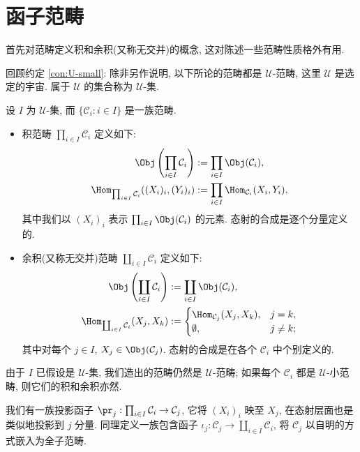 \section{函子范畴}\label{sec:functor-category}
首先对范畴定义积和余积(又称无交并)的概念, 这对陈述一些范畴性质格外有用.

回顾约定 \ref{con:U-small}: 除非另作说明, 以下所论的范畴都是 $\mathcal{U}$-范畴, 这里 $\mathcal{U}$ 是选定的宇宙. 属于 $\mathcal{U}$ 的集合称为 $\mathcal{U}$-集.

\begin{definition}
	设 $I$ 为 $\mathcal{U}$-集, 而 $\{\mathcal{C}_i : i \in I \}$ 是一族范畴.
	\begin{itemize}
		\item 积范畴 $\prod_{i \in I} \mathcal{C}_i$ 定义如下:
			\begin{align*}
				\Obj\left( \prod_{i \in I} \mathcal{C}_i \right) & := \prod_{i \in I} \Obj(\mathcal{C}_i), \\
				\Hom_{\prod_{i \in I} \mathcal{C}_i}( (X_i)_i, (Y_i)_i ) & := \prod_{i \in I} \Hom_{\mathcal{C}_i}(X_i, Y_i),
			\end{align*}
			其中我们以 $(X_i)_i$ 表示 $\prod_{i \in I} \Obj(\mathcal{C}_i)$ 的元素. 态射的合成是逐个分量定义的.
		\item 余积(又称无交并)范畴 $\coprod_{i \in I} \mathcal{C}_i$ 定义如下:
			\begin{align*}
				\Obj\left( \coprod_{i \in I} \mathcal{C}_i \right) & := \coprod_{i \in I} \Obj(\mathcal{C}_i), \\
				\Hom_{\coprod_{i \in I} \mathcal{C}_i}(X_j, X_k) & :=
				\begin{cases}
					\Hom_{\mathcal{C}_j}(X_j, X_k), & j = k, \\
					\emptyset, & j \neq k;
				\end{cases}
			\end{align*}
			其中对每个 $j \in I$, $X_j \in \Obj(\mathcal{C}_j)$. 态射的合成是在各个 $\mathcal{C}_i$ 中个别定义的.
	\end{itemize}
\end{definition}
由于 $I$ 已假设是 $\mathcal{U}$-集, 我们造出的范畴仍然是 $\mathcal{U}$-范畴; 如果每个 $\mathcal{C}_i$ 都是 $\mathcal{U}$-小范畴, 则它们的积和余积亦然.

我们有一族投影函子 $\pr_j: \prod_{i \in I} \mathcal{C}_i \to \mathcal{C}_j$, 它将 $(X_i)_i$ 映至 $X_j$, 在态射层面也是类似地投影到 $j$ 分量. 同理定义一族包含函子 $\iota_j: \mathcal{C}_j \to \coprod_{i \in I} \mathcal{C}_i$, 将 $\mathcal{C}_j$ 以自明的方式嵌入为全子范畴.

